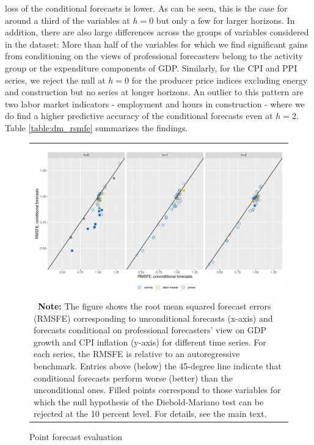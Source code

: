 \documentclass[notitlepage,a4paper,12pt]{article}
\begin{document}
loss of the conditional forecasts is lower. As can  be seen, this is the case for around a third of the variables at $h=0$ but only a few for larger horizons. In addition, there are also large differences across the groups of variables considered in the dataset: More than half of the variables for which we find significant gains from conditioning on the views of professional forecasters belong to the activity group or the expenditure components of GDP. Similarly, for the CPI and PPI series, we reject the null at $h=0$ for the producer price indices excluding energy and construction but no series at longer horizons. An outlier to this pattern are two labor market indicators - employment and hours in construction - where we do find a higher predictive accuracy of the conditional forecasts even at $h=2$. Table \ref{table:dm_rsmfe} summarizes the findings. 

\begin{figure}[htp!] \centering
    \caption{Point forecast evaluation \label{fig:rmsfe}}
    \footnotesize
    \begin{tabular}{p{16cm}}
        \multicolumn{1}{c}{\includegraphics*[scale = 0.6]{../figures/fig_eval_rmsfe.pdf}} \\
        {
        \footnotesize \textbf{Note:} The figure shows the root mean squared forecast errors (RMSFE)  corresponding to unconditional forecasts (x-axis) and forecasts conditional on professional forecasters' view on GDP growth and CPI inflation (y-axis) for different time series. For each series, the RMSFE is relative to an autoregressive benchmark. Entries above (below) the 45-degree line indicate that conditional forecasts perform worse (better) than the unconditional ones. Filled points correspond to those variables for which the null hypothesis of the Diebold-Mariano test can be rejected at the 10 percent level. For details, see the main text. 
        }
        \end{tabular}
    \newline
    \normalsize
\end{figure}
\end{document}

